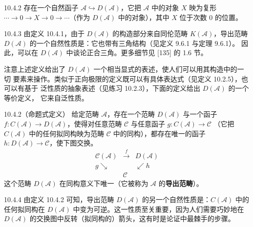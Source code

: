 \begin{wrem}{10.4.2}
存在一个自然函子 $\mathcal A\hookrightarrow D(\mathcal A)$，它把 $\mathcal A$ 中的对象
$X$ 映为复形 $\cdots\to0\to X\to0\to\cdots$（作为 $D(\mathcal A)$ 中的对象），其中
$X$ 位于次数 $0$ 的位置。
\end{wrem}

\begin{wrem}{10.4.3}
由定义 10.4.1，由于 $D(\mathcal A)$ 的构造部分来自同伦范畴 $K(\mathcal A)$，导出范畴
$D(\mathcal A)$ 的一个自然性质是：它也带有三角结构（见定义 9.6.1 与定理 9.6.1）。
因此，可以在 $D(\mathcal A)$ 中谈论正合三角。更多细节见 [135] 的 1.6 节。
\end{wrem}

注意上述定义给出了 $D(\mathcal A)$ 一个相当显式的表述，使人们可以用其构造中的一切
要素来操作。类似于正向极限的定义既可以有具体表达式（见定义 10.2.5），也可以有基于
泛性质的抽象表述（见练习 10.2.3），下面的定义给出 $D(\mathcal A)$ 的一个等价定义，
它来自泛性质。

\begin{wdefn}{10.4.2}（命题式定义）
给定范畴 $\mathcal A$，存在一个范畴 $D(\mathcal A)$ 与一个函子
$f:C(\mathcal A)\to D(\mathcal A)$，使得对任意范畴 $\mathcal C$ 与任意函子
$g:C(\mathcal A)\to\mathcal C$
（它把 $C(\mathcal A)$ 中的任何拟同构映为范畴 $\mathcal C$ 中的同构），都存在唯一的函子
$h:D(\mathcal A)\to\mathcal C$，使下图交换。
\[
\begin{array}{ccc}
\mathcal C(\mathcal A) & \xrightarrow{f} & D(\mathcal A)\\[10pt]
{\scriptstyle g}\searrow & & \swarrow{\scriptstyle h}\\
& \mathcal C &
\end{array}
\]
这个范畴 $D(\mathcal A)$ 在同构意义下唯一（它被称为 $\mathcal A$ 的\textbf{导出范畴}）。
\end{wdefn}


\begin{wrem}{10.4.4}
由定义 10.4.2 可知，导出范畴 $D(\mathcal A)$ 的另一个自然性质是：$C(\mathcal A)$ 中的
任何拟同构在 $D(\mathcal A)$ 中变为可逆。这一性质至关重要，因为人们需要巧妙地在
$D(\mathcal A)$ 的交换图中反转（拟同构的）箭头，这有时是论证中最棘手的步骤。
\end{wrem}

